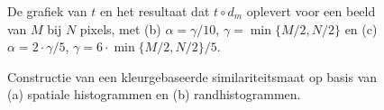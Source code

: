 \begin{figure}[bp]
\vspace{5pt}
\centering
{}
\caption{\label{fig:kwadratische_interpolatie}De grafiek van $t$ en het resultaat dat
$t \circ d_m$ oplevert voor een beeld van $M$ bij $N$ pixels, met
(b) $\alpha=\gamma / 10$, $\gamma = \min\{M/2, N/2\}$ en 
(c) $\alpha=2 \cdot \gamma / 5$, $\gamma = 6 \cdot \min\{M/2, N/2\} / 5$.}
\end{figure}

\begin{figure}[!bp]
\vspace{10pt}
\centering
{}
\qquad
{}
\caption{\label{fig:constructie_uitgebreide_histogrammen}Constructie van een kleurgebaseerde 
similariteitsmaat op basis van (a) spatiale histogrammen en (b) randhistogrammen.}
\end{figure}

